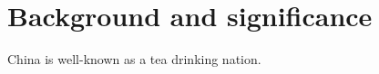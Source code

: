 \section{Background and significance}\label{sec:Background and Significance}

China is well-known as a tea drinking nation.
